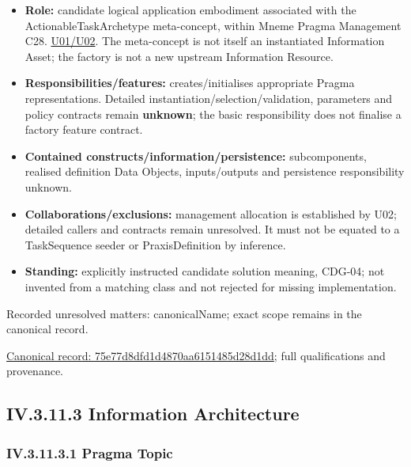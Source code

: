 \begin{itemize}


\item \textbf{Role:} candidate logical application embodiment associated with the
  ActionableTaskArchetype meta-concept, within Mneme Pragma Management C28.
  \href{\detokenize{../../../../../../../../docs/markdown/05-information-systems-architecture/sources.md#u02}}{U01/U02}. The meta-concept is not itself an instantiated
  Information Asset; the factory is not a new upstream Information Resource.

\item \textbf{Responsibilities/features:} creates/initialises appropriate Pragma
  representations. Detailed instantiation/selection/validation, parameters and
  policy contracts remain \textbf{unknown}; the basic responsibility does not finalise
  a factory feature contract.

\item \textbf{Contained constructs/information/persistence:} subcomponents, realised
  definition Data Objects, inputs/outputs and persistence responsibility unknown.

\item \textbf{Collaborations/exclusions:} management allocation is established by U02;
  detailed callers and contracts remain unresolved. It must not be equated to a
  TaskSequence seeder or PraxisDefinition by inference.

\item \textbf{Standing:} explicitly instructed candidate solution meaning, CDG-04; not
  invented from a matching class and not rejected for missing implementation.

\end{itemize}

{\small Recorded unresolved matters: canonicalName; exact scope remains in the canonical record.}\par
{\footnotesize \href{../../../../../../../continuum/application/application-component/75e77d8dfd1d4870aa6151485d28d1dd.md}{Canonical record: 75e77d8dfd1d4870aa6151485d28d1dd}; full qualifications and provenance.}\par
\subsection*{IV.3.11.3 Information Architecture}
\label{navigation:IV.3.11.3}

\subsubsection*{IV.3.11.3.1 Pragma Topic}
\label{navigation:IV.3.11.3.1}

